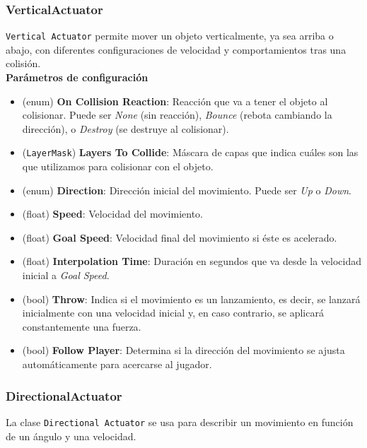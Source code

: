 \subsubsection{VerticalActuator}
\texttt{Vertical Actuator} permite mover un objeto verticalmente, ya sea arriba o abajo, con diferentes configuraciones de velocidad y comportamientos tras una colisión.\\

\textbf{Parámetros de configuración}
\begin{itemize}
	\item (enum) \textbf{On Collision Reaction}: Reacción que va a tener el objeto al colisionar. Puede ser \textit{None} (sin reacción), \textit{Bounce} (rebota cambiando la dirección), o \textit{Destroy} (se destruye al colisionar).
	\item (\texttt{LayerMask}) \textbf{Layers To Collide}: Máscara de capas que indica cuáles son las que utilizamos para colisionar con el objeto.
	\item (enum) \textbf{Direction}: Dirección inicial del movimiento. Puede ser \textit{Up} o \textit{Down}.
	\item (float) \textbf{Speed}: Velocidad del movimiento.
	\item (float) \textbf{Goal Speed}: Velocidad final del movimiento si éste es acelerado.
	\item (float) \textbf{Interpolation Time}: Duración en segundos que va desde la velocidad inicial a \textit{Goal Speed}.
	\item (bool) \textbf{Throw}: Indica si el movimiento es un lanzamiento, es decir, se lanzará inicialmente con una velocidad inicial y, en caso contrario, se aplicará constantemente una fuerza.
	\item (bool) \textbf{Follow Player}: Determina si la dirección del movimiento se ajusta automáticamente para acercarse al jugador.
\end{itemize}

\subsubsection{DirectionalActuator}
La clase \texttt{Directional Actuator} se usa para describir un movimiento en función de un ángulo y una velocidad.\\

